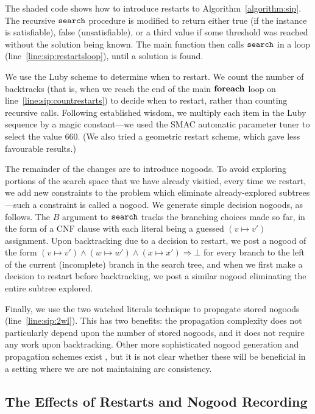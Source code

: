 \documentclass[a4paper,UKenglish]{lipics-v2018}
\newcommand{\siplineref}[1]{line~\ref{line:sip:#1}}
\newcommand{\algorithmref}[1]{Algorithm~\ref{#1}}
\begin{document}
The shaded code shows how to introduce restarts to \algorithmref{algorithm:sip}. The recursive
$\FuncSty{search}$ procedure is modified to return either true (if the instance is satisfiable),
false (unsatisfiable), or a third value if some threshold was reached without the solution being
known.  The main function then calls $\FuncSty{search}$ in a loop (\siplineref{restartsloop}), until
a solution is found.

We use the Luby scheme \cite{DBLP:journals/ipl/LubySZ93} to determine when to restart. We count the
number of backtracks (that is, when we reach the end of the main $\KwSty{foreach}$ loop on
\siplineref{countrestarts}) to decide when to restart, rather than counting recursive calls.
Following established wisdom, we multiply each item in the Luby sequence by a magic constant---we
used the SMAC automatic parameter tuner \cite{DBLP:conf/lion/HutterHL11} to select the value 660.
(We also tried a geometric restart scheme, which gave less favourable results.)

The remainder of the changes are to introduce nogoods. To avoid exploring portions of the search
space that we have already visitied, every time we restart, we add new constraints to the problem
which eliminate already-explored subtrees---such a constraint is called a nogood. We generate simple
decision nogoods, as follows. The $B$ argument to $\FuncSty{search}$ tracks the branching choices
made so far, in the form of a CNF clause with each literal being a guessed $(v \mapsto v')$
assignment. Upon backtracking due to a decision to restart, we post a nogood of the form $(v \mapsto
v') \wedge (w \mapsto w') \wedge (x \mapsto x') \Rightarrow \bot$ for every branch to the left of
the current (incomplete) branch in the search tree, and when we first make a decision to restart
before backtracking, we post a similar nogood eliminating the entire subtree explored.

Finally, we use the two watched literals technique \cite{DBLP:conf/dac/MoskewiczMZZM01} to
propagate stored nogoods (\siplineref{2wl}). This has two benefits: the propagation complexity does
not particularly depend upon the number of stored nogoods, and it does not require any work upon
backtracking.  Other more sophisticated nogood generation and propagation schemes exist
\cite{DBLP:conf/aaai/LeeSZ16,DBLP:conf/cp/GlorianBLLM17}, but it is not clear whether these will be
beneficial in a setting where we are not maintaining arc consistency.

\subsection{The Effects of Restarts and Nogood Recording}
\end{document}
